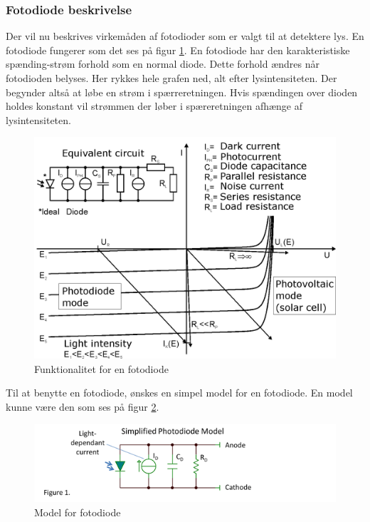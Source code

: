 \documentclass[HardwareDesign/HardwareDesign_main.tex]{subfiles}
\begin{document}
\subsubsection{Fotodiode beskrivelse} \label{sec:photodiode_description}
Der vil nu beskrives virkemåden af fotodioder som er valgt til at detektere lys. En fotodiode fungerer som det ses på figur \ref{fig:photodiode_operation}. En fotodiode har den karakteristiske spænding-strøm forhold som en normal diode. Dette forhold ændres når fotodioden belyses. Her rykkes hele grafen ned, alt efter lysintensiteten. Der begynder altså at løbe en strøm i spærreretningen. Hvis spændingen over dioden holdes konstant vil strømmen der løber i spæreretningen afhænge af lysintensiteten. 
\begin{figure}[H]
    \centering
    \includegraphics[width=\textwidth]{HardwareDesign/CupSensor/graphics/Photodiode_operation.png}
    \caption{Funktionalitet for en fotodiode \autocite{photodiodeWikipedia}}
    \label{fig:photodiode_operation}
\end{figure}

Til at benytte en fotodiode, ønskes en simpel model for en fotodiode. En model kunne være den som ses på figur \ref{fig:photodiodeModel}.

\begin{figure}[H]
    \centering
    \includegraphics[width=\textwidth]{HardwareDesign/CupSensor/graphics/photodiodeModel.png}
    \caption{Model for fotodiode\autocite{photodiodesTI}}
    \label{fig:photodiodeModel}
\end{figure}
\end{document}
